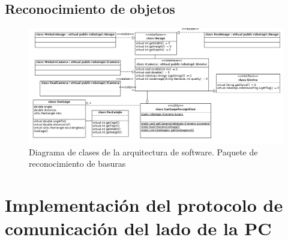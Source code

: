 \subsection{Reconocimiento de objetos}
\begin{landscape}
\begin{figure}[h]
	\centering
	\includegraphics[scale=0.5]{comportamientos/figures/api3.png}
	\caption[Arquitectura de software: m\'odulo de reconocimiento]{Diagrama de clases de
	la arquitectura de software. Paquete de reconocimiento de basuras}
	\label{fig:soft_arq_reconmodule}
\end{figure}
\end{landscape}


% 
% 
% 

\section[Implementaci\'on del protocolo en PC]{Implementaci\'on del protocolo de comunicaci\'on del lado de la PC}
